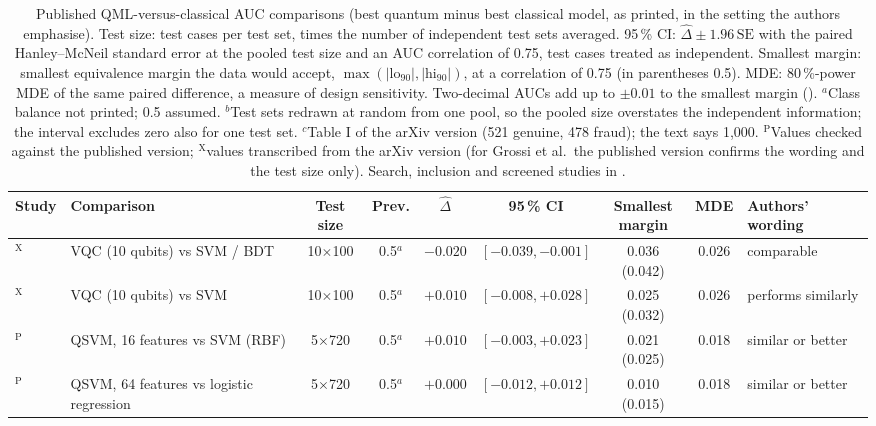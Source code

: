 \documentclass[11pt,a4paper]{article}
\begin{document}
\begin{table}[htbp]
\centering
\caption{Published QML-versus-classical AUC comparisons (best quantum minus best classical model, as printed, in the setting the authors emphasise). Test size: test cases per test set, times the number of independent test sets averaged. 95\,\% CI: $\hat\Delta\pm1.96\,\text{SE}$ with the paired Hanley--McNeil standard error at the pooled test size and an AUC correlation of 0.75, test cases treated as independent. Smallest margin: smallest equivalence margin the data would accept, $\max(|\text{lo}_{90}|,|\text{hi}_{90}|)$, at a correlation of 0.75 (in parentheses 0.5). MDE: 80\,\%-power MDE of the same paired difference, a measure of design sensitivity. Two-decimal AUCs add up to $\pm0.01$ to the smallest margin (). $^{a}$Class balance not printed; 0.5 assumed. $^{b}$Test sets redrawn at random from one pool, so the pooled size overstates the independent information; the interval excludes zero also for one test set. $^{c}$Table I of the arXiv version (521 genuine, 478 fraud); the text says 1{,}000. $^{\mathrm{P}}$Values checked against the published version; $^{\mathrm{X}}$values transcribed from the arXiv version (for Grossi et al.\ the published version confirms the wording and the test size only). Search, inclusion and screened studies in .}
\label{tab:literature}
{\footnotesize
\setlength{\tabcolsep}{3pt}
\begin{tabularx}{\textwidth}{@{}>{\raggedright\arraybackslash}p{2.0cm}>{\raggedright\arraybackslash}Xcccccc>{\raggedright\arraybackslash}p{1.55cm}@{}}
\toprule
\textbf{Study} & \textbf{Comparison} & \textbf{Test size} & \textbf{Prev.} & $\hat\Delta$ & \textbf{95\,\% CI} & \shortstack{\textbf{Smallest}\\\textbf{margin}} & \textbf{MDE} & \textbf{Authors' wording} \\
\midrule
\citet{wu2021}$^{\mathrm{X}}$ & VQC (10 qubits) vs SVM / BDT & 10$\times$100 & 0.5$^{a}$ & $-0.020$ & $[-0.039,-0.001]$ & 0.036 (0.042) & 0.026 & comparable \\
\citet{wu2021}$^{\mathrm{X}}$ & VQC (10 qubits) vs SVM & 10$\times$100 & 0.5$^{a}$ & $+0.010$ & $[-0.008,+0.028]$ & 0.025 (0.032) & 0.026 & performs similarly \\
\citet{belis2021}$^{\mathrm{P}}$ & QSVM, 16 features vs SVM (RBF) & 5$\times$720 & 0.5$^{a}$ & $+0.010$ & $[-0.003,+0.023]$ & 0.021 (0.025) & 0.018 & similar or better \\
\citet{belis2021}$^{\mathrm{P}}$ & QSVM, 64 features vs logistic regression & 5$\times$720 & 0.5$^{a}$ & $+0.000$ & $[-0.012,+0.012]$ & 0.010 (0.015) & 0.018 & similar or better \\

\end{tabularx}}
\end{table}
\end{document}
